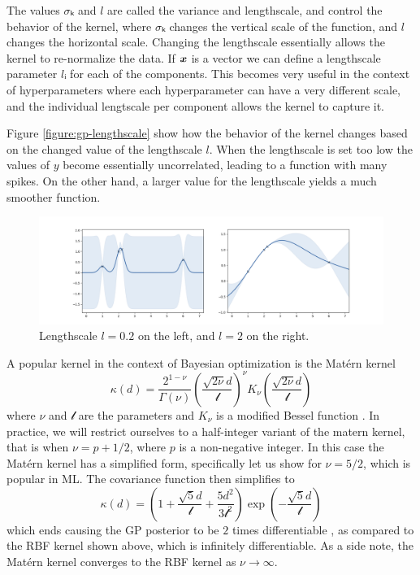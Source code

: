 The values $σₖ$ and $l$ are called the variance and lengthscale, and control
the behavior of the kernel, where $σₖ$ changes the vertical scale of the
function, and $l$ changes the horizontal scale. Changing the lengthscale
essentially allows the kernel to re-normalize the data. If ${\boldsymbol{x}}$ is a vector we
can define a lengthscale parameter $lᵢ$ for each of the components. This
becomes very useful in the context of hyperparameters where each hyperparameter
can have a very different scale, and the individual lengtscale per component
allows the kernel to capture it.

Figure \autoref{figure:gp-lengthscale} show how the behavior of the kernel
changes based on the changed value of the lengthscale $l$. When the lengthscale
is set too low the values of $y$ become essentially uncorrelated, leading to a
function with many spikes. On the other hand, a larger value for the lengthscale
yields a much smoother function.

\begin{figure}
  \begin{center}
    \includegraphics[width=1.0\textwidth]{images/gp-lengthscale.png}
    \caption{Lengthscale $l = 0.2$ on the left, and $l = 2$ on the right.}
    
    \label{figure:gp-lengthscale}
  \end{center}
\end{figure}

A popular kernel in the context of Bayesian optimization is the Mat\'ern kernel
$$
\kappa(d) = \frac{2^{1 - \nu}}{\Gamma(\nu)} \left( \frac{\sqrt{2\nu}d}{\mathcal{l}} \right)^\nu K_\nu \left( \frac{\sqrt{2\nu}d}{\mathcal{l}} \right)
$$
where $\nu$ and $\mathcal{l}$ are the parameters and $K_\nu$ is a modified Bessel function \citep{williams2006gaussian}. In practice, we will restrict ourselves to a half-integer variant of the matern kernel, that is when $\nu = p + 1/2$, where $p$ is a non-negative integer. In this case the Mat\'ern kernel has a simplified form, specifically let us show for $\nu = 5/2$, which is popular in ML. The covariance function then simplifies to
$$
\kappa(d) = \left( 1 + \frac{\sqrt{5}d}{\mathcal{l}} + \frac{5d^2}{3\mathcal{l}^2} \right) \exp \left( - \frac{\sqrt{5}d}{\mathcal{l}} \right)
$$
which ends causing the GP posterior to be $2$ times differentiable \citep{williams2006gaussian}, as compared to the RBF kernel shown above, which is infinitely differentiable. As a side note, the Mat\'ern kernel converges to the RBF kernel as $\nu \rightarrow \infty$.

